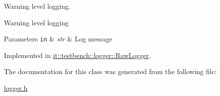 Warning level logging. 

Warning level logging


\begin{DoxyParams}[1]{Parameters}
\mbox{\tt in}  & {\em str} & Log message \\
\hline
\end{DoxyParams}


Implemented in \hyperlink{classit_1_1testbench_1_1logger_1_1RawLogger_a6257a59594ebdd57988d98c27663d8a1}{it\-::testbench\-::logger\-::\-Raw\-Logger}.



The documentation for this class was generated from the following file\-:\begin{DoxyCompactItemize}
\item 
\hyperlink{logger_8h}{logger.\-h}\end{DoxyCompactItemize}
